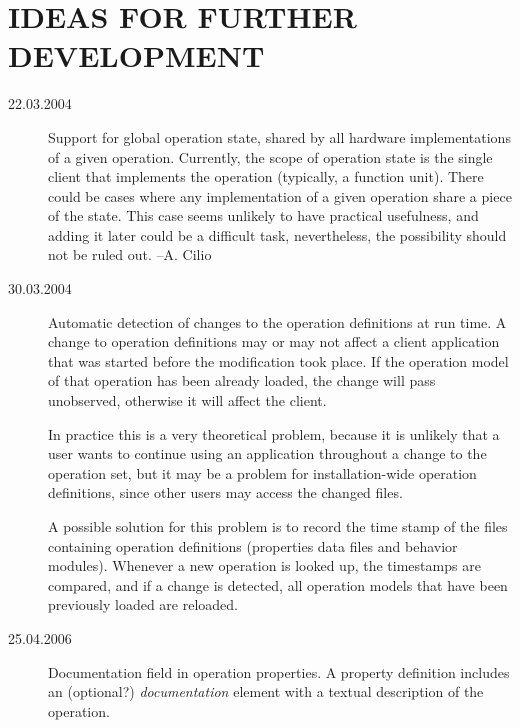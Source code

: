 \documentclass[twoside]{tce}
\begin{document}
\chapter{IDEAS FOR FURTHER DEVELOPMENT}


\begin{description}
\item[22.03.2004]%
  Support for global operation state, shared by all hardware implementations
  of a given operation.  Currently, the scope of operation state is the
  single client that implements the operation (typically, a function unit).
  There could be cases where any implementation of a given operation share a
  piece of the state.  This case seems unlikely to have practical
  usefulness, and adding it later could be a difficult task, nevertheless,
  the possibility should not be ruled out.  --A. Cilio

\item[30.03.2004]%
  Automatic detection of changes to the operation definitions at run time.
  A change to operation definitions may or may not affect a client
  application that was started before the modification took place.  If the
  operation model of that operation has been already loaded, the change will
  pass unobserved, otherwise it will affect the client.

  In practice this is a very theoretical problem, because it is unlikely
  that a user wants to continue using an application throughout a change to
  the operation set, but it may be a problem for installation-wide operation
  definitions, since other users may access the changed files.

  A possible solution for this problem is to record the time stamp of the
  files containing operation definitions (properties data files and
  behavior modules).  Whenever a new operation is looked up, the timestamps
  are compared, and if a change is detected, all operation models that have
  been previously loaded are reloaded.

\item[25.04.2006]%
  Documentation field in operation properties. A property definition
  includes an (optional?) \emph{documentation} element with a textual
  description of the operation.
\end{description}
\end{document}
